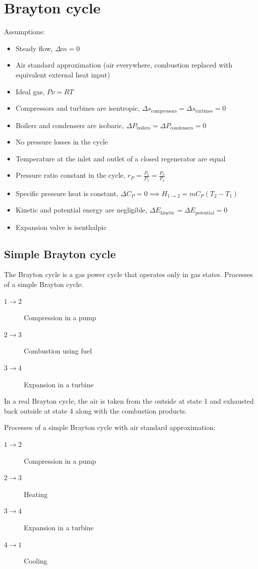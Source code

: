 \documentclass[10pt, twocolumn]{article}
\begin{document}
\section{Brayton cycle}
Assumptions:
\begin{itemize}
  \item Steady flow, \(\Delta \dot{m} = 0\)
  \item Air standard approximation (air everywhere, combustion replaced with equivalent external heat input)
  \item Ideal gas, \(P \nu = RT\)
  \item Compressors and turbines are isentropic, \(\Delta s_\mathrm{compressors} = \Delta s_\mathrm{turbines} = 0\)
  \item Boilers and condensers are isobaric, \(\Delta P_\mathrm{boilers} = \Delta P_\mathrm{condensers} = 0\)
  \item No pressure losses in the cycle
  \item Temperature at the inlet and outlet of a closed regenerator are equal
  \item Pressure ratio constant in the cycle, \(r_P = \frac{P_2}{P_1} = \frac{P_3}{P_4}\)
  \item Specific pressure heat is constant, \(\Delta C_P = 0 \implies H_{1 \to 2} = m C_P (T_2 - T_1)\)
  \item Kinetic and potential energy are negligible, \(\Delta E_\mathrm{kinetic} = \Delta E_\mathrm{potential} = 0\)
  \item Expansion valve is isenthalpic
\end{itemize}


\subsection{Simple Brayton cycle}
The Brayton cycle is a gas power cycle that operates only in gas states.
Processes of a simple Brayton cycle:
\begin{description}
  \item[\(1 \rightarrow 2\)] Compression in a pump
  \item[\(2 \rightarrow 3\)] Combustion using fuel
  \item[\(3 \rightarrow 4\)] Expansion in a turbine
\end{description}
In a real Brayton cycle, the air is taken from the outside at state 1 and exhausted back outside at state 4 along with the combustion products.

Processes of a simple Brayton cycle with air standard approximation:
\begin{description}
  \item[\(1 \rightarrow 2\)] Compression in a pump
  \item[\(2 \rightarrow 3\)] Heating
  \item[\(3 \rightarrow 4\)] Expansion in a turbine
  \item[\(4 \rightarrow 1\)] Cooling
\end{description}
\end{document}
